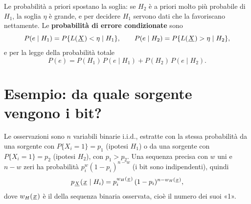 
Le probabilità a priori spostano la soglia: se $H_2$ è a priori molto più probabile di $H_1$, la soglia $\eta$ è grande,
e per decidere $H_1$ servono dati che la favoriscano nettamente. Le \textbf{probabilità di errore condizionate} sono
\[ P(e \mid H_1) = P\{L({\mkern1mu\underline{X}\mkern1mu}) < \eta \mid H_1\} , \qquad P(e \mid H_2) = P\{L({\mkern1mu\underline{X}\mkern1mu}) > \eta \mid H_2\} , \]
e per la legge della probabilità totale
\[ P(e) = P(H_1)\, P(e \mid H_1) + P(H_2)\, P(e \mid H_2) . \]

\section{Esempio: da quale sorgente vengono i bit?}

Le osservazioni sono $n$ variabili binarie i.i.d., estratte con la stessa probabilità da una sorgente con
$P\{X_i = 1\} = p_1$ (ipotesi $H_1$) o da una sorgente con $P\{X_i = 1\} = p_2$ (ipotesi $H_2$), con $p_1 > p_2$.
Una sequenza precisa con $w$ uni e $n - w$ zeri ha probabilità $p_i^{w} (1 - p_i)^{n - w}$ (i bit sono indipendenti),
quindi
\[ p_{{\mkern1mu\underline{X}\mkern1mu}}({\mkern1mu\underline{x}\mkern1mu} \mid H_i) = p_i^{w_H({\mkern1mu\underline{x}\mkern1mu})}\, (1 - p_i)^{n - w_H({\mkern1mu\underline{x}\mkern1mu})} , \]
dove $w_H({\mkern1mu\underline{x}\mkern1mu})$ è il  della sequenza binaria osservata, cioè il numero dei suoi «1».


